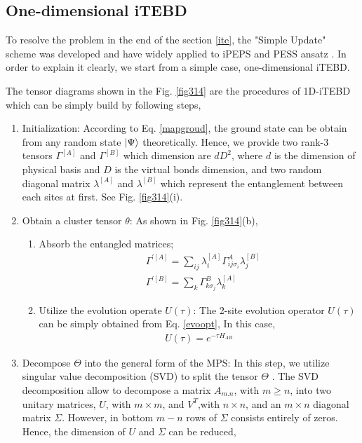 \subsection{One-dimensional iTEBD}
To resolve the problem in the end of the section \ref{ite}, the "Simple Update" scheme was developed and have widely applied to iPEPS \cite{} and PESS ansatz \cite{}. In order to explain it clearly, we start from a simple case, one-dimensional iTEBD. 

The tensor diagrams shown in the Fig. \ref{fig314} are the procedures of 1D-iTEBD which can be simply build by following steps,
\begin{enumerate}
		\item Initialization: According to Eq. \ref{mapgroud}, the ground state can be obtain from any random state $\Ket{\Psi}$ theoretically. Hence, we provide two rank-3 tensors $\Gamma^{[A]}$ and $\Gamma^{[B]}$ which dimension are $dD^2$, where $d$ is the dimension of physical basis and $D$ is the virtual bonds dimension, and two random diagonal matrix $\lambda^{[A]}$ and $\lambda^{[B]}$ which represent the entanglement between each sites at first. See Fig. \ref{fig314}(i).
		\item Obtain a cluster tensor $\theta$: As shown in Fig. \ref{fig314}(b),
			\begin{enumerate}
				\item Absorb the entangled matrices; 
					\begin{align}
						&\Gamma^{\prime [A]} = \sum_{ij}{\lambda^{[A]}_{i} \Gamma^{A}_{ij \sigma_i} \lambda^{[B]}_{j}} \\
						&\Gamma^{\prime [B]} = \sum_{k}{\Gamma^{B}_{k \sigma_j} \lambda^{[A]}_{k}}
					\end{align}
						\item Utilize the evolution operate $U(\tau)$: The 2-site evolution operator $U(\tau)$ can be simply obtained from Eq. \ref{evoopt}, In this case, 
							\begin{align}
								U(\tau) = e^{-\tau H_{AB}}
							\end{align}
			\end{enumerate}
		\item Decompose $\Theta$ into the general form of the MPS: In this step, we utilize singular value decomposition (SVD) to split the tensor $\Theta$ . The SVD decomposition allow to decompose a matrix $A_{m.n}$, with $m \geq n$, into two unitary matrices, $U$, with $m \times m$, and $V^{T}$,with $n \times n$, and an $m \times n$ diagonal matrix $\Sigma$. However, in bottom $m - n$ rows of $\Sigma$ consists entirely of zeros. Hence, the dimension of $U$ and $\Sigma$ can be reduced,

\end{enumerate}
